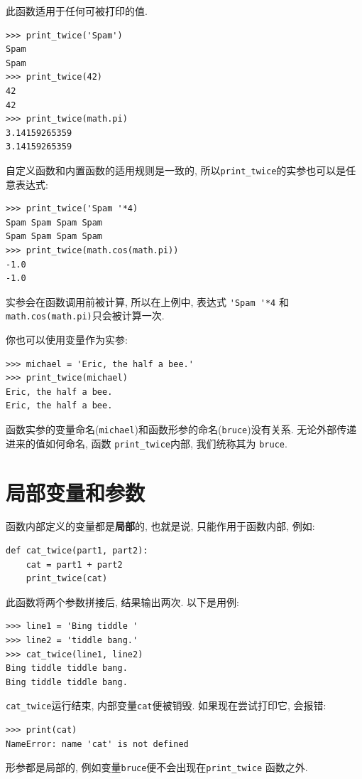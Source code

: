 \documentclass[10pt]{book}
\begin{document}
此函数适用于任何可被打印的值. 

\begin{verbatim}
>>> print_twice('Spam')
Spam
Spam
>>> print_twice(42)
42
42
>>> print_twice(math.pi)
3.14159265359
3.14159265359
\end{verbatim}
%
自定义函数和内置函数的适用规则是一致的, 
所以\verb"print_twice"的实参也可以是任意表达式:

\begin{verbatim}
>>> print_twice('Spam '*4)
Spam Spam Spam Spam
Spam Spam Spam Spam
>>> print_twice(math.cos(math.pi))
-1.0
-1.0
\end{verbatim}
%
实参会在函数调用前被计算, 所以在上例中, 表达式 \verb"'Spam '*4" 和
{\tt math.cos(math.pi)}只会被计算一次. 

你也可以使用变量作为实参:

\begin{verbatim}
>>> michael = 'Eric, the half a bee.'
>>> print_twice(michael)
Eric, the half a bee.
Eric, the half a bee.
\end{verbatim}
%
函数实参的变量命名({\tt michael})和函数形参的命名({\tt bruce})没有关系. 
无论外部传递进来的值如何命名, 函数 \verb"print_twice"内部, 我们统称其为 {\tt bruce}. 


\section{局部变量和参数}

函数内部定义的变量都是{\bf 局部}的, 也就是说, 只能作用于函数内部, 
例如:

\begin{verbatim}
def cat_twice(part1, part2):
    cat = part1 + part2
    print_twice(cat)
\end{verbatim}
%
此函数将两个参数拼接后, 结果输出两次. 以下是用例:

\begin{verbatim}
>>> line1 = 'Bing tiddle '
>>> line2 = 'tiddle bang.'
>>> cat_twice(line1, line2)
Bing tiddle tiddle bang.
Bing tiddle tiddle bang.
\end{verbatim}
%
\verb"cat_twice"运行结束, 内部变量{\tt cat}便被销毁. 
如果现在尝试打印它, 会报错:

\begin{verbatim}
>>> print(cat)
NameError: name 'cat' is not defined
\end{verbatim}
%
形参都是局部的, 例如变量{\tt bruce}便不会出现在\verb"print_twice" 函数之外.
\end{document}
